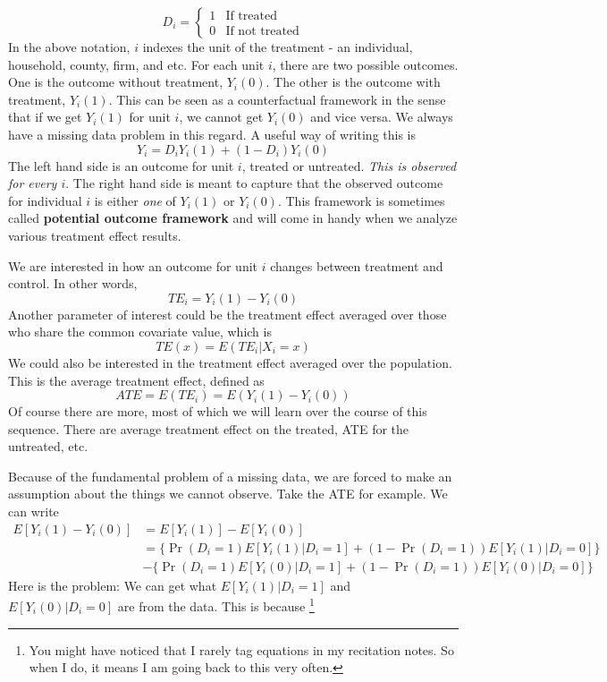 \documentclass[12pt]{article}
\theoremstyle{definition}
\theoremstyle{property}
\theoremstyle{assumption}
\theoremstyle{example}
\theoremstyle{comment}
\begin{document}
\[
D_i = \begin{cases} 1 & \text{If treated} \\ 0 & \text{If not treated}\end{cases}
\]
In the above notation, $i$ indexes the unit of the treatment - an individual, household,  county, firm, and etc. For each unit $i$, there are two possible outcomes. One is the outcome without treatment,  $Y_i(0)$. The other is the outcome with treatment, $Y_i(1)$. This can be seen as a counterfactual framework in the sense that if we get $Y_i(1)$ for unit $i$, we cannot get $Y_i(0)$ and vice versa. We always have a missing data problem in this regard. A useful way of writing this is
\[
Y_i = D_iY_i(1) + (1-D_i)Y_i(0)
\]
The left hand side is an outcome for unit $i$, treated or untreated. \textit{This is observed for every $i$}. The right hand side is meant to capture that the observed outcome for individual $i$ is either \textit{one} of $Y_i(1)$ or $Y_i(0)$. This framework is sometimes called \textbf{potential outcome framework} and will come in handy when we analyze various treatment effect results. \par
We are interested in how an outcome for unit $i$ changes between treatment and control. In other words,
\[
TE_i = Y_i(1)-Y_i(0)
\]
Another parameter of interest could be the treatment effect averaged over those who share the common covariate value, which is
\[
TE(x) = E(TE_i|X_i=x)
\]
We could also be interested in the treatment effect averaged over the population. This is the average treatment effect, defined as
\[
ATE=E(TE_i)=E(Y_i(1)-Y_i(0))
\]
Of course there are more, most of which we will learn over the course of this sequence. There are average treatment effect on the treated, ATE for the untreated, etc. \par
Because of the fundamental  problem of a missing data, we are forced to make an assumption about the things we cannot observe. Take the ATE for example. We can write
\begin{align*}
E[Y_i(1)-Y_i(0)] & = E[Y_i(1)]-E[Y_i(0)]\\
&=\{\Pr(D_i=1)E[Y_i(1)|D_i=1]+(1-\Pr(D_i=1))E[Y_i(1)|D_i=0]\}\\
&-\{\Pr(D_i=1)E[Y_i(0)|D_i=1]+(1-\Pr(D_i=1))E[Y_i(0)|D_i=0]\}
\end{align*}
Here is the problem: We can get what $E[Y_i(1)|D_i=1]$ and $E[Y_i(0)|D_i=0]$ are from the data. This is because \footnote{You might have noticed that I rarely tag equations in my recitation notes. So when I do, it means I am going back to this very often. }
\end{document}
